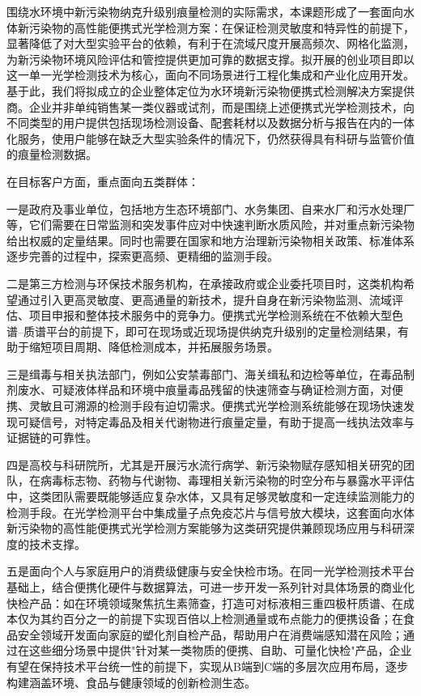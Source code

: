 \documentclass[12pt,a4paper]{article}
\begin{document}
围绕水环境中新污染物纳克升级别痕量检测的实际需求，本课题形成了一套面向水体新污染物的高性能便携式光学检测方案：在保证检测灵敏度和特异性的前提下，显著降低了对大型实验平台的依赖，有利于在流域尺度开展高频次、网格化监测，为新污染物环境风险评估和管控提供更加可靠的数据支撑。拟开展的创业项目即以这一单一光学检测技术为核心，面向不同场景进行工程化集成和产业化应用开发。基于此，我们将拟成立的企业整体定位为水环境新污染物便携式检测解决方案提供商。企业并非单纯销售某一类仪器或试剂，而是围绕上述便携式光学检测技术，向不同类型的用户提供包括现场检测设备、配套耗材以及数据分析与报告在内的一体化服务，使用户能够在缺乏大型实验条件的情况下，仍然获得具有科研与监管价值的痕量检测数据。

在目标客户方面，重点面向五类群体：

一是政府及事业单位，包括地方生态环境部门、水务集团、自来水厂和污水处理厂等，它们需要在日常监测和突发事件应对中快速判断水质风险，并对重点新污染物给出权威的定量结果。同时也需要在国家和地方治理新污染物相关政策、标准体系逐步完善的过程中，探索更高频、更精细的监测手段。

二是第三方检测与环保技术服务机构，在承接政府或企业委托项目时，这类机构希望通过引入更高灵敏度、更高通量的新技术，提升自身在新污染物监测、流域评估、项目申报和整体技术服务中的竞争力。便携式光学检测系统在不依赖大型色谱--质谱平台的前提下，即可在现场或近现场提供纳克升级别的定量检测结果，有助于缩短项目周期、降低检测成本，并拓展服务场景。

三是缉毒与相关执法部门，例如公安禁毒部门、海关缉私和边检等单位，在毒品制剂废水、可疑液体样品和环境中痕量毒品残留的快速筛查与确证检测方面，对便携、灵敏且可溯源的检测手段有迫切需求。便携式光学检测系统能够在现场快速发现可疑信号，对特定毒品及相关代谢物进行痕量定量，有助于提高一线执法效率与证据链的可靠性。

四是高校与科研院所，尤其是开展污水流行病学、新污染物赋存感知相关研究的团队，在病毒标志物、药物与代谢物、毒理相关新污染物的时空分布与暴露水平评估中，这类团队需要既能够适应复杂水体，又具有足够灵敏度和一定连续监测能力的检测手段。在光学检测平台中集成量子点免疫芯片与信号放大模块，这套面向水体新污染物的高性能便携式光学检测方案能够为这类研究提供兼顾现场应用与科研深度的技术支撑。

五是面向个人与家庭用户的消费级健康与安全快检市场。在同一光学检测技术平台基础上，结合便携化硬件与数据算法，可进一步开发一系列针对具体场景的商业化快检产品：如在环境领域聚焦抗生素筛查，打造可对标液相三重四极杆质谱、在成本仅为其约百分之一的前提下实现百倍以上检测通量或布点能力的便携设备；在食品安全领域开发面向家庭的塑化剂自检产品，帮助用户在消费端感知潜在风险；通过在这些细分场景中提供"针对某一类物质的便携、自助、可量化快检"产品，企业有望在保持技术平台统一性的前提下，实现从B端到C端的多层次应用布局，逐步构建涵盖环境、食品与健康领域的创新检测生态。
\end{document}
